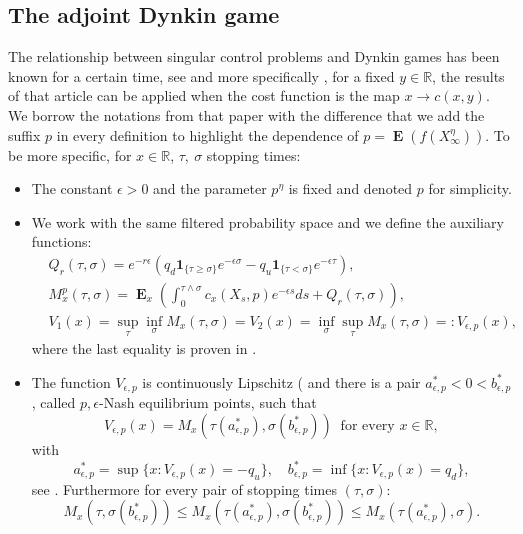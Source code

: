 \documentclass{article}
\newcommand\E{\operatorname{\mathbf{E}}}
\begin{document}
\subsection{The adjoint Dynkin game}
The relationship between singular control problems and Dynkin games has been known for a certain time, see \cite{KARATZAS, KW,boetius, GT,GT0} and more specifically \cite{MO}, for a fixed $y \in \mathbb{R}$, the results of that article can be applied when the cost function is the map $x \rightarrow c(x,y)$. We borrow the notations from that paper with the difference that we add the suffix $p$ in every definition to highlight the dependence of $p= \E \left(f(X^{\eta}_{\infty}) \right)$. To be more specific, for $x \in \mathbb{R}$, $\tau, \ \sigma$ stopping times:
\begin{itemize} 
    \item[\rm{i)}] The constant $\epsilon>0$ and the parameter $p^{\eta}$ is fixed and denoted $p$ for simplicity.
    \item[\rm{ii)}] We work with the same filtered probability space and we define the auxiliary functions:
    \begin{align*}
          &      Q_r(\tau,\sigma)=e^{-r\epsilon}\left(
        q_d\mathbf{1}_{\{\tau \geq \sigma\}}e^{-\epsilon\sigma}  
        -q_u\mathbf{1}_{\{\tau < \sigma\}}e^{-\epsilon\tau} 
        \right),  \\
        & M^p_x(\tau,\sigma)=
\E_x\left(\int^{\tau\wedge\sigma}_0 c_x(X_s,p)e^{-\epsilon s}ds+Q_r(\tau,\sigma)\right),   \\
& V_1(x)  = \sup_{\tau} \inf_{\sigma} M_x(\tau, \sigma)=
V_2(x)= \inf_{\sigma} \sup_{\tau} M_x(\tau, \sigma)=:V_{\epsilon,p}(x),
        \end{align*}
where the last equality is proven in \cite[Proposition 3]{MO}.
\item[\rm{iii)}] The function $V_{\epsilon,p}$ is continuously Lipschitz (\cite[Proposition 7]{MO} and there is a pair $ a^*_{\epsilon,p}<0<b^*_{\epsilon,p}$, called $p,\epsilon$-Nash equilibrium points, such that
$$V_{\epsilon,p}(x)= M_x (\tau (a^*_{\epsilon,p}), \sigma(b^*_{\epsilon,p})  ) \ \text{ for every }  x\in \mathbb{R},$$
with 
$$
a^*_{\epsilon,p}=\sup\{x\colon V_{\epsilon,p}(x)=-q_u\},\quad
b^*_{\epsilon,p}=\inf\{x\colon V_{\epsilon,p}(x)=q_d\},
$$
see \cite[Proposition 5]{MO}. Furthermore for every pair of stopping times $(\tau,\sigma)$:
$$  M_x (\tau , \sigma(b^*_{\epsilon,p})  ) \leq M_x (\tau (a^*_{\epsilon,p}), \sigma(b^*_{\epsilon,p})  ) \leq  M_x (\tau (a^*_{\epsilon,p}), \sigma  ). $$
\end{itemize}
\end{document}
